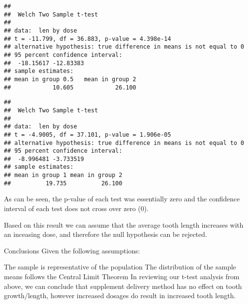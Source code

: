 \documentclass[
]{article}
\newenvironment{Shaded}{\begin{snugshade}}{\end{snugshade}}
\newcommand{\DataTypeTok}[1]{\textcolor[rgb]{0.13,0.29,0.53}{#1}}
\newcommand{\FloatTok}[1]{\textcolor[rgb]{0.00,0.00,0.81}{#1}}
\newcommand{\KeywordTok}[1]{\textcolor[rgb]{0.13,0.29,0.53}{\textbf{#1}}}
\newcommand{\NormalTok}[1]{#1}
\newcommand{\OperatorTok}[1]{\textcolor[rgb]{0.81,0.36,0.00}{\textbf{#1}}}
\newcommand{\StringTok}[1]{\textcolor[rgb]{0.31,0.60,0.02}{#1}}
\begin{document}
\begin{verbatim}
## 
##  Welch Two Sample t-test
## 
## data:  len by dose
## t = -11.799, df = 36.883, p-value = 4.398e-14
## alternative hypothesis: true difference in means is not equal to 0
## 95 percent confidence interval:
##  -18.15617 -12.83383
## sample estimates:
## mean in group 0.5   mean in group 2 
##            10.605            26.100
\end{verbatim}

\begin{Shaded}
\end{Shaded}

\begin{verbatim}
## 
##  Welch Two Sample t-test
## 
## data:  len by dose
## t = -4.9005, df = 37.101, p-value = 1.906e-05
## alternative hypothesis: true difference in means is not equal to 0
## 95 percent confidence interval:
##  -8.996481 -3.733519
## sample estimates:
## mean in group 1 mean in group 2 
##          19.735          26.100
\end{verbatim}

As can be seen, the p-value of each test was essentially zero and the
confidence interval of each test does not cross over zero (0).

Based on this result we can assume that the average tooth length
increases with an inceasing dose, and therefore the null hypothesis can
be rejected.

Conclusions Given the following assumptions:

The sample is representative of the population The distribution of the
sample means follows the Central Limit Theorem In reviewing our t-test
analysis from above, we can conclude that supplement delivery method has
no effect on tooth growth/length, however increased dosages do result in
increased tooth length.
\end{document}
